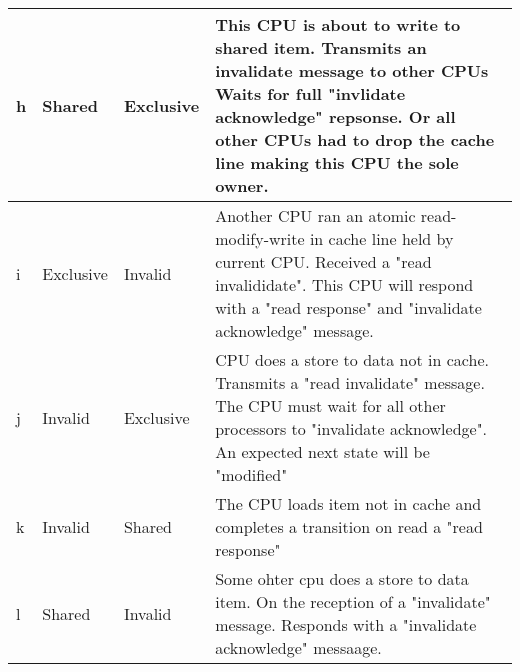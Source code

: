 \documentclass{article}
\begin{document}
\begin{center}
\begin{tabular*}{0.75\textwidth} {| l | l | l | l| }
    \\
    \hline

    h & Shared & Exclusive & 

    This CPU is about to write to shared item. Transmits an invalidate
    message to other CPUs Waits for full "invlidate acknowledge"
    repsonse. Or all other CPUs had to drop the cache line making this
    CPU the sole owner. \\
    \hline
    i & Exclusive & Invalid & 

    Another CPU ran an atomic read-modify-write in cache line held by
    current CPU. Received a "read invalididate". This CPU will respond
    with a "read response" and "invalidate acknowledge" message.   \\

    \hline

    j & Invalid & Exclusive &

    CPU does a store to data not in cache. Transmits a "read
    invalidate" message. The CPU must wait for all other processors to
    "invalidate acknowledge". An expected next state will be
    "modified"  
    \\
    \hline

    k & Invalid & Shared &
    
    The CPU loads item not in cache and completes a transition on read
    a "read response" 
    \\
    \hline
    l & Shared & Invalid &
    
    Some ohter cpu does a store to data item. On the reception of a
    "invalidate" message. Responds with a "invalidate acknowledge"
    messaage. \\


    \hline


    
  \end{tabular*}
\end{center}
\end{document}

